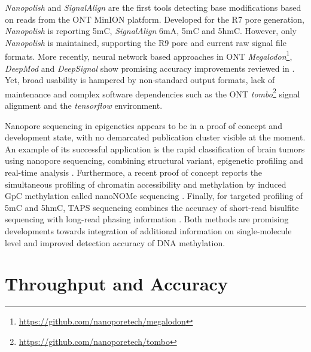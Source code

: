 \textit{Nanopolish} \cite{Simpson2017} and \textit{SignalAlign} \cite{Rand2017} are the first tools detecting base modifications based on reads from the ONT MinION platform.
Developed for the R7 pore generation, \textit{Nanopolish} is reporting 5mC, \textit{SignalAlign} 6mA, 5mC and 5hmC.
However, only \textit{Nanopolish} is maintained, supporting the R9 pore and current raw signal file formats.
More recently, neural network based approaches in ONT \textit{Megalodon}\footnote{\url{https://github.com/nanoporetech/megalodon}}, \textit{DeepMod} \cite{Liu2019a} and \textit{DeepSignal} \cite{Ni2018} show promising accuracy improvements reviewed in \cite{Yuen2020}.
Yet, broad usability is hampered by non-standard output formats, lack of maintenance and complex software dependencies such as the ONT \textit{tombo}\footnote{\url{https://github.com/nanoporetech/tombo}} signal alignment and the \textit{tensorflow} environment.

Nanopore sequencing in epigenetics appears to be in a proof of concept and development state, with no demarcated publication cluster visible at the moment.
An example of its successful application is the rapid classification of brain tumors using nanopore sequencing, combining structural variant, epigenetic profiling and real-time analysis \cite{Euskirchen2017}.
Furthermore, a recent proof of concept reports the simultaneous profiling of chromatin accessibility and methylation by induced GpC methylation called nanoNOMe sequencing \cite{Lee2020}.
Finally, for targeted profiling of 5mC and 5hmC, TAPS sequencing combines the accuracy of short-read bisulfite sequencing with long-read phasing information \cite{Liu2020}.
Both methods are promising developments towards integration of additional information on single-molecule level and improved detection accuracy of DNA methylation.





\section{Throughput and Accuracy}
\label{sec:stat_of_art:throughput}



